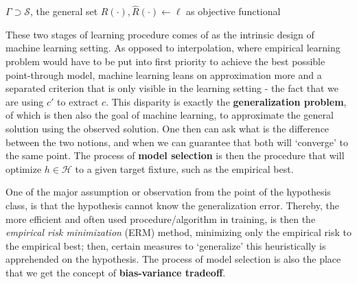 \documentclass[10pt]{article} %
\begin{document}
\begin{algorithm}[htb]
    \renewcommand{\algorithmcfname}{Optimization problem}
    \caption{Empirical-generalization learning dynamics (non-proxy)}
    \Begin
    {
        $\Gamma\supset \mathcal{S}$, the general set\;
        $R(\cdot),\hat{R}(\cdot)\gets\ell$ as objective functional\;
    }
    \label{algo:algo_optim_ideal}
\end{algorithm}

These two stages of learning procedure comes of as the intrinsic design of machine learning setting. As opposed to interpolation, where empirical learning problem would have to be put into first priority to achieve the best possible point-through model, machine learning leans on approximation more and a separated criterion that is only visible in the learning setting - the fact that we are using $c'$ to extract $c$. This disparity is exactly the \textbf{generalization problem}, of which is then also the goal of machine learning, to approximate the general solution using the observed solution. One then can ask what is the difference between the two notions, and when we can guarantee that both will `converge' to the same point. The process of \textbf{model selection} is then the procedure that will optimize $h\in \mathcal{H}$ to a given target fixture, such as the empirical best. 

One of the major assumption or observation from the point of the hypothesis class, is that the hypothesis cannot know the generalization error. Thereby, the more efficient and often used procedure/algorithm in training, is then the \textit{empirical risk minimization} (ERM) method, minimizing only the empirical risk to the empirical best; then, certain measures to `generalize' this heuristically is apprehended on the hypothesis. The process of model selection is also the place that we get the concept of \textbf{bias-variance tradeoff}.  
\end{document}
